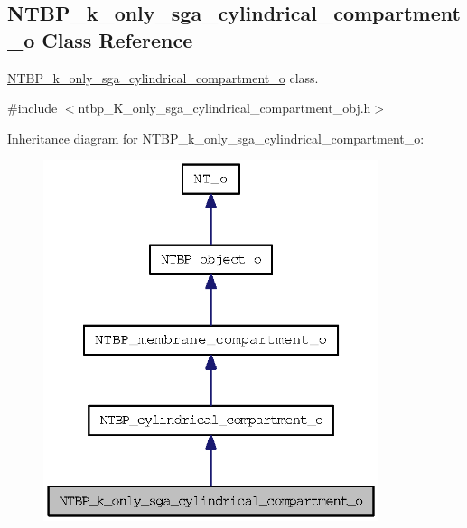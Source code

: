 \subsection{NTBP\_\-k\_\-only\_\-sga\_\-cylindrical\_\-compartment\_\-o Class Reference}
\label{class_n_t_b_p__k__only__sga__cylindrical__compartment__o}


\hyperlink{class_n_t_b_p__k__only__sga__cylindrical__compartment__o}{NTBP\_\-k\_\-only\_\-sga\_\-cylindrical\_\-compartment\_\-o} class.  




{\ttfamily \#include $<$ntbp\_\-K\_\-only\_\-sga\_\-cylindrical\_\-compartment\_\-obj.h$>$}



Inheritance diagram for NTBP\_\-k\_\-only\_\-sga\_\-cylindrical\_\-compartment\_\-o:
\nopagebreak
\begin{figure}[H]
\begin{center}
\leavevmode
\includegraphics[width=278pt]{class_n_t_b_p__k__only__sga__cylindrical__compartment__o__inherit__graph}
\end{center}
\end{figure}


